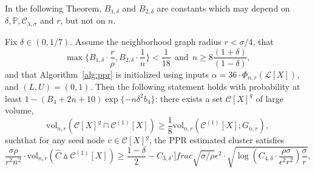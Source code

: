 \documentclass[11pt,twoside]{article}
\newcommand{\1}{\mathbf{1}}
\newcommand{\mc}[1]{\mathcal{#1}}
\newcommand{\Pbb}{\mathbb{P}}
\newcommand{\wh}[1]{\widehat{#1}}
\newcommand{\vol}{\mathrm{vol}}
\begin{document}
In the following Theorem, $B_{1,\delta}$ and $B_{2,\delta}$ are constants which may depend on $\delta,\Pbb,\mc{C}_{\lambda,\sigma}$ and $r$, but not on $n$.
\begin{theorem}
	\label{thm:ppr_lb}
	Fix $\delta \in (0,1/7)$. Assume the neighborhood graph radius $r < \sigma/4$, that
	\begin{equation}
	\label{eqn:ppr_lb_condition}
	\max\biggl\{ B_{1,\delta} \cdot \frac{r}{\rho}, B_{2,\delta} \cdot \frac{1}{n} \biggr\} < \frac{1}{18}~~\text{and}~~n \geq 8 \frac{(1 + \delta)}{(1 - \delta)},
	\end{equation} 
	and that Algorithm~\ref{alg:ppr} is initialized using inputs $\alpha = 36 \cdot \Phi_{n,r}(\mc{L}[X])$, and $(L,U) = (0,1)$.  Then the following statement holds with probability at least $1 - (B_4 + 2n + 10)\exp\{-n\delta^2 b_4\}$: there exists a set $\mc{C}[X]^g$ of large volume, 
$$
\vol_{n,r}(\mc{C}[X]^g \cap \mc{C}^{(1)}[X]) \geq \frac{1}{8} \vol_{n,r}(\mc{C}^{(1)}[X];G_{n,r}),
$$
suchthat for any seed node $v \in \mc{C}[X]^g$, the PPR estimated cluster
	\smash{$\wh{C}$} satisfies    
	\begin{equation}
	\label{eqn:ppr_lb}
	\frac{\sigma \rho}{r^2 n^2} \cdot \vol_{n,r}(\wh{C} \vartriangle \mc{C}^{(1)}[X]) \geq \frac{1 - \delta}{2} -  C_{3,\delta} \cdot ]frac{\sqrt{\sigma/\rho}}{\epsilon^2} \cdot \sqrt{ \log\left(C_{4,\delta} \cdot \frac{\rho \sigma}{\epsilon^2 r^2}\right) \frac{\sigma}{r}},   
	\end{equation} 
\end{theorem}
\end{document}
